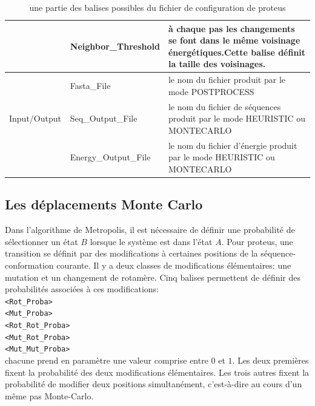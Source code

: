 \begin{table}[!htbp]
\begin{tabular}{|p{0.2\linewidth}|p{0.32\linewidth}|p{0.48\linewidth}|}
                         & Neighbor\_Threshold & à chaque pas les changements se font dans le même voisinage énergétiques.Cette balise définit la taille des voisinages.\\   \hline
        
                         & Fasta\_File & le nom du fichier produit par le mode POSTPROCESS\\    \cline{2-3}             
        Input/Output     & Seq\_Output\_File & le nom  du fichier de séquences produit par le mode HEURISTIC ou MONTECARLO\\    \cline{2-3}             
                         & Energy\_Output\_File & le nom du fichier d'énergie produit par le mode  HEURISTIC ou MONTECARLO\\   \hline              

      \end{tabular} 

      \caption{une partie des balises possibles du fichier de configuration de proteus}      

      \label{tab:balise_proteus}

  \end{table}

\subsection{Les déplacements Monte Carlo}
\label{sub:MC_move}
Dans l'algorithme de Metropolis, il est nécessaire de définir une probabilité de sélectionner un état $B$ lorsque le système est dans l'état $A$. Pour proteus, une transition se définit par des modifications à certaines positions de la séquence-conformation courante. Il y a deux classes de modifications élémentaires: une mutation et un changement de rotamère. Cinq balises permettent de définir des probabilités associées à ces modifications: \\
\verb!<Rot_Proba>! \\
\verb!<Mut_Proba>! \\
\verb!<Rot_Rot_Proba>! \\
\verb!<Mut_Rot_Proba>! \\
\verb!<Mut_Mut_Proba>!  \\
chacune prend en paramètre une valeur comprise entre $0$ et $1$. Les deux premières fixent la probabilité des deux modifications élémentaires. Les trois autres fixent la probabilité de modifier deux positions simultanément, c'est-à-dire au cours d'un même pas Monte-Carlo.

